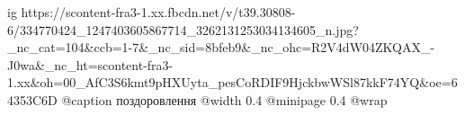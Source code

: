  
 
 
 
 

\ifcmt
  ig https://scontent-fra3-1.xx.fbcdn.net/v/t39.30808-6/334770424_1247403605867714_3262131253034134605_n.jpg?_nc_cat=104&ccb=1-7&_nc_sid=8bfeb9&_nc_ohc=R2V4dW04ZKQAX_-J0wa&_nc_ht=scontent-fra3-1.xx&oh=00_AfC3S6kmt9pHXUyta_pesCoRDIF9HjckbwWSl87kkF74YQ&oe=64353C6D
  @caption поздоровлення
  @width 0.4
  @minipage 0.4
  @wrap \parpic[r]
\fi
